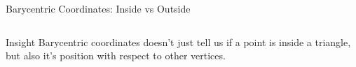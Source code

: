 \begin{frame}{Barycentric Coordinates: Inside vs Outside}
\begin{columns}
\begin{column}{0.5\textwidth}
        \end{column}
    \end{columns}
    \pause
    \begin{conceptbox}{Insight}
        Barycentric coordinates doesn't just tell us if a point is inside a triangle, but also it's position with respect to other vertices.
    \end{conceptbox}
\end{frame}

\endinput

